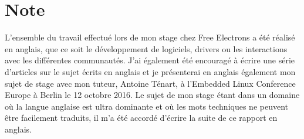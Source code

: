 \chapter*{Note}

L'ensemble du travail effectué lors de mon stage chez Free Electrons a été réalisé en anglais, que ce soit le développement de logiciels, drivers ou les interactions avec les différentes communautés. J'ai également été encouragé à écrire une série d'articles sur le sujet écrits en anglais et je présenterai en anglais également mon sujet de stage avec mon tuteur, Antoine Ténart, à l'Embedded Linux Conference Europe à Berlin le 12 octobre 2016. Le sujet de mon stage étant dans un domaine où la langue anglaise est ultra dominante et où les mots techniques ne peuvent être facilement traduits, il m'a été accordé d'écrire la suite de ce rapport en anglais.
